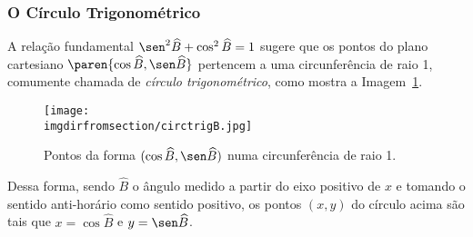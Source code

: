 \subsubsection{O Círculo Trigonométrico}

A relação fundamental $\sen^2 \widehat B + \cos^2 \widehat B = 1$
sugere que os pontos do plano cartesiano $\paren{\cos \widehat B,
\sen \widehat B}$ pertencem a uma circunferência de raio 1, comumente 
chamada de \emph{círculo trigonométrico}, como
mostra a Imagem~\ref{fig:circulo-trigonometrico-b}.
%
\begin{figure}[H]
\centering
\texttt{[image: \\imgdirfromsection/circtrigB.jpg]}
\caption{Pontos da forma $(\cos \widehat B, \sen \widehat B)$ numa circunferência de raio 1.}
\label{fig:circulo-trigonometrico-b}
\end{figure}

Dessa forma, sendo $\widehat B$ o ângulo medido a partir do eixo
positivo de $x$ e tomando o sentido anti-horário como sentido
positivo, os pontos $(x, y)$ do círculo acima são tais que $x = \cos
\widehat B$ e $y = \sen \widehat B$.